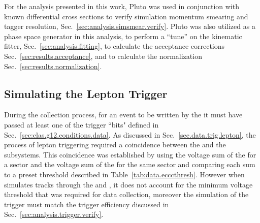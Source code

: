 For the analysis presented in this work, Pluto was used in conjunction with known differential cross sections to verify simulation momentum smearing and tagger resolution, Sec.~\ref{sec:analysis.simsmear.verify}. Pluto was also utilized as a phase space generator in this analysis, to perform a ``tune'' on the kinematic fitter, Sec.~\ref{sec:analysis.fitting}, to calculate the acceptance corrections Sec.~\ref{sec:results.acceptance}, and to calculate the normalization Sec.~\ref{sec:results.normalization}.
\subsection{Simulating the Lepton Trigger}\label{sec:analysis.accept.trigger}
During the collection process, for an event to be written by the  it must have passed at least one of the trigger ``bits" defined in Sec.~\ref{sec:clas.g12.conditions.data}. As discussed in Sec.~\ref{sec.data.trig.lepton}, the process of lepton triggering required a coincidence between the  and the  subsystems. This coincidence was established by using the voltage sum of the  for a sector and the voltage sum of the  for the same sector and comparing each sum to a preset threshold described in Table~\ref{tab:data.ecccthresh}. However when  simulates tracks through the  and , it does not account for the minimum voltage threshold that was required for data collection, moreover the simulation of the trigger must match the trigger efficiency discussed in Sec.~\ref{sec:analysis.trigger.verify}.

